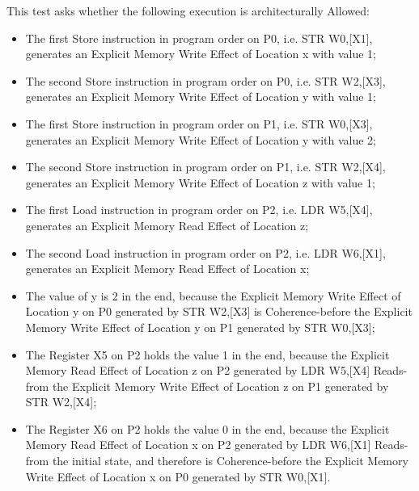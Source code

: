 This test asks whether the following execution is architecturally Allowed:

\begin{itemize}
  \item The first Store instruction in program order on P0, i.e. STR W0,[X1], generates an Explicit Memory Write Effect of Location x with value 1;
  \item The second Store instruction in program order on P0, i.e. STR W2,[X3], generates an Explicit Memory Write Effect of Location y with value 1;
  \item The first Store instruction in program order on P1, i.e. STR W0,[X3], generates an Explicit Memory Write Effect of Location y with value 2;
  \item The second Store instruction in program order on P1, i.e. STR W2,[X4], generates an Explicit Memory Write Effect of Location z with value 1;
  \item The first Load instruction in program order on P2, i.e. LDR W5,[X4], generates an Explicit Memory Read Effect of Location z;
  \item The second Load instruction in program order on P2, i.e. LDR W6,[X1], generates an Explicit Memory Read Effect of Location x;
  \item The value of y is 2 in the end, because the Explicit Memory Write Effect of Location y on P0 generated by STR W2,[X3] is Coherence-before the Explicit Memory Write Effect of Location y on P1 generated by STR W0,[X3];
  \item The Register X5 on P2 holds the value 1 in the end, because the Explicit Memory Read Effect of Location z on P2 generated by LDR W5,[X4] Reads-from the Explicit Memory Write Effect of Location z on P1 generated by STR W2,[X4];
  \item The Register X6 on P2 holds the value 0 in the end, because the Explicit Memory Read Effect of Location x on P2 generated by LDR W6,[X1] Reads-from the initial state, and therefore is Coherence-before the Explicit Memory Write Effect of Location x on P0 generated by STR W0,[X1].
\end{itemize}
